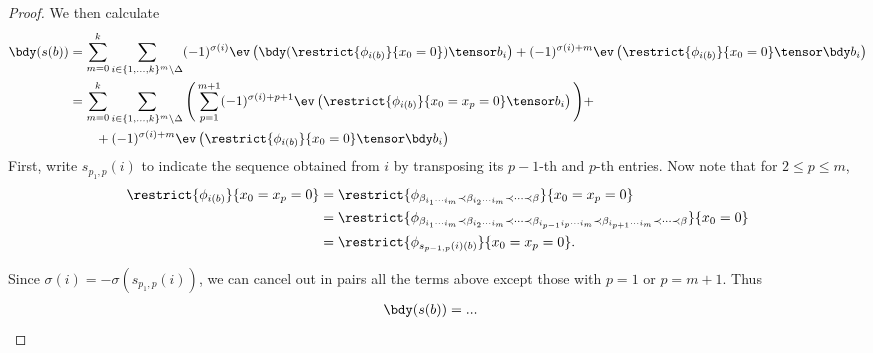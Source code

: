\begin{proof}
We then calculate
\begin{align*}
\bdy(s(b)) & = \sum_{m=0}^{k} \sum_{i \in \{1, \ldots, k\}^{m} \setminus \Delta} (-1)^{\sigma(i)} \ev\left(\bdy(\restrict{\phi_{i(b)}}{x_0 = 0})\tensor b_i\right) + (-1)^{\sigma(i) + m} \ev\left(\restrict{\phi_{i(b)}}{x_0 = 0} \tensor \bdy b_i\right) \\
	& = \sum_{m=0}^{k} \sum_{i \in \{1, \ldots, k\}^{m} \setminus \Delta} \Bigg(\sum_{p=1}^{m+1} (-1)^{\sigma(i)+p+1} \ev\left(\restrict{\phi_{i(b)}}{x_0 = x_p = 0}\tensor b_i\right) \Bigg) + \\
	& \qquad + (-1)^{\sigma(i) + m} \ev\left(\restrict{\phi_{i(b)}}{x_0 = 0} \tensor \bdy b_i\right)
\end{align*}
First, write $s_{p_1,p}(i)$ to indicate the sequence obtained from $i$ by transposing its $p-1$-th and $p$-th entries. Now note that for $2 \leq p \leq m$,
\begin{align*}
\restrict{\phi_{i(b)}}{x_0=x_p=0} & = \restrict{\phi_{\beta_{i_1\cdots i_m} \prec \beta_{i_2 \cdots i_m} \prec \cdots \prec \beta}}{x_0=x_p=0} \\
	& = \restrict{\phi_{\beta_{i_1\cdots i_m} \prec \beta_{i_2 \cdots i_m} \prec \cdots \prec \beta_{i_{p-1} i_p \cdots i_m} \prec \beta_{i_{p+1} \cdots i_m} \prec \cdots \prec \beta}}{x_0=0} \\
	& = \restrict{\phi_{s_{p-1,p}(i)(b)}}{x_0=x_p=0}.
\end{align*}

Since $\sigma(i) = - \sigma(s_{p_1,p}(i))$, we can cancel out in pairs all the terms above except those with $p=1$ or $p=m+1$. Thus
\begin{align*}
\bdy(s(b)) & = ...
\end{align*}



\end{proof}

